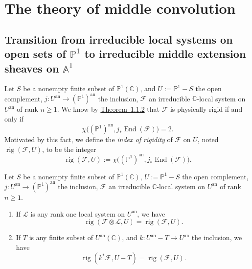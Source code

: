 \chapter{The theory of middle convolution}
\label{chap:2}
\setcounter{section}{-1}

\section{Transition from irreducible local systems on open sets of
\texorpdfstring{\(\mathbb{P}^1\)}{P1} to irreducible middle extension sheaves
on \texorpdfstring{\(\mathbb{A}^1\)}{A1}}
\label{sec:2.0}

Let \(S\) be a nonempty finite subset of \(\mathbb{P}^1(\mathbb{C})\), and
\(U:=\mathbb{P}^1-S\) the open complement,
\(j:U^{\mathrm{an}}\to(\mathbb{P}^1)^{\mathrm{an}}\) the inclusion,
\(\mathcal{F}\) an irreducible \(\mathbb{C}\)-local system on
\(U^{\mathrm{an}}\) of rank \(n\geq 1\). We know by
\hyperref[thm:1.1.2]{Theorem~1.1.2} that \(\mathcal{F}\) is physically rigid
if and only if
\[
  \chi\bigl((\mathbb{P}^1)^{\mathrm{an}},
  j_*\operatorname{End}(\mathcal{F})\bigr)=2.
\]
Motivated by this fact, we define the \emph{index of rigidity} of
\(\mathcal{F}\) on \(U\), noted \(\operatorname{rig}(\mathcal{F},U)\), to be
the integer
\[
  \operatorname{rig}(\mathcal{F},U):=
  \chi\bigl((\mathbb{P}^1)^{\mathrm{an}},
  j_*\operatorname{End}(\mathcal{F})\bigr).
\]

\setcounter{theorem}{1}
\begin{lemma}
\label{lem:2.0.2}
Let \(S\) be a nonempty finite subset of \(\mathbb{P}^1(\mathbb{C})\),
\(U:=\mathbb{P}^1-S\) the open complement,
\(j:U^{\mathrm{an}}\to(\mathbb{P}^1)^{\mathrm{an}}\) the inclusion,
\(\mathcal{F}\) an irreducible \(\mathbb{C}\)-local system on
\(U^{\mathrm{an}}\) of rank \(n\geq 1\).
\begin{enumerate}[label=(\alph*)]
\item If \(\mathcal{L}\) is any rank one local system on \(U^{\mathrm{an}}\),
we have
\[
  \operatorname{rig}(\mathcal{F}\otimes\mathcal{L},U)
  =\operatorname{rig}(\mathcal{F},U).
\]
\item If \(T\) is any finite subset of \(U^{\mathrm{an}}(\mathbb{C})\), and
\(k:U^{\mathrm{an}}-T\to U^{\mathrm{an}}\) the inclusion, we have
\[
  \operatorname{rig}(k^*\mathcal{F},U-T)
  =\operatorname{rig}(\mathcal{F},U).
\]
\end{enumerate}
\end{lemma}

